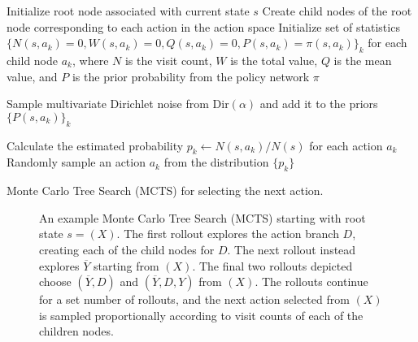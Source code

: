 {
\begin{algorithm}[H]
\BlankLine
Initialize root node associated with current state $s$ \;
Create child nodes of the root node corresponding to each action in the action space \;
Initialize set of statistics $\{ N(s,a_k)=0, W(s,a_k)=0, Q(s,a_k)=0, P(s,a_k)= \pi(s, a_k) \}_k$ for each child node $a_k$, where $N$ is the visit count, $W$ is the total value, $Q$ is the mean value, and $P$ is the prior probability from the policy network $\pi$ \;

Sample multivariate Dirichlet noise from $\text{Dir}(\alpha)$ and add it to the priors $\{P(s, a_k)\}_k$ \;

Calculate the estimated probability $p_k \leftarrow N(s, a_k) / N(s)$ for each action $a_k$ \;
Randomly sample an action $a_k$ from the distribution $\{ p_k \}$ \;

\caption{Monte Carlo Tree Search (MCTS) for selecting the next action. \label{al:mcts}}
\end{algorithm}
}

\begin{figure}[H]
    \centering
    
    \caption{An example Monte Carlo Tree Search (MCTS) starting with root state $s = (X)$. The first rollout explores the action branch $D$, creating each of the child nodes for $D$. The next rollout instead explores $\overline{Y}$ starting from $(X)$. The final two rollouts depicted choose $(\overline{Y}, D)$ and $(\overline{Y}, D, Y)$ from $(X)$. The rollouts continue for a set number of rollouts, and the next action selected from $(X)$ is sampled proportionally according to visit counts of each of the children nodes.}
    \label{fig:mcts}
\end{figure}

